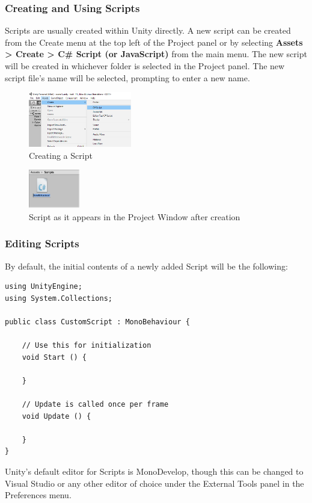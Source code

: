 \subsubsection{Creating and Using Scripts}
Scripts are usually created within Unity directly. A new script can be created from the Create menu at the top left of the Project panel or by selecting \textbf{Assets \textgreater\xspace Create \textgreater\xspace C\# Script (or JavaScript)} from the main menu. The new script will be created in whichever folder is selected in the Project panel. The new script file’s name will be selected, prompting to enter a new name.
\begin{figure}[H]
  \centering
  \includegraphics[width=0.4\textwidth]{images/CreateScript.png}
  \caption{Creating a Script}
\end{figure}
\begin{figure}[H]
  \centering
  \includegraphics[width=0.2\textwidth]{images/NewScriptIcon.png}
  \caption{Script as it appears in the Project Window after creation}
\end{figure}
\subsubsection{Editing Scripts}
By default, the initial contents of a newly added Script will be the following:
\begin{lstlisting}
using UnityEngine;
using System.Collections;

public class CustomScript : MonoBehaviour {

    // Use this for initialization
    void Start () {
    
    }
    
    // Update is called once per frame
    void Update () {
    
    }
}
\end{lstlisting}
Unity's default editor for Scripts is MonoDevelop, though this can be changed to Visual Studio or any other editor of choice under the External Tools panel in the Preferences menu.

